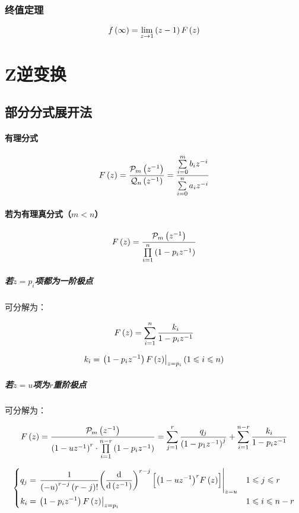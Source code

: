 \documentclass{article}
\begin{document}
\subsubsection{终值定理}

\[f\left(\infty\right)=\lim_{z\to1}\left(z-1\right)F\left(z\right)\]

\section{Z逆变换}

\subsection{部分分式展开法\label{Z变换部分分式展开法}}

\paragraph{有理分式}

\[F\left(z\right)=\frac{\mathcal P_m\left(z^{-1}\right)}{\mathcal Q_n\left(z^{-1}\right)}
    =\frac{\sum\limits_{i=0}^mb_iz^{-i}}{\sum\limits_{i=0}^na_iz^{-i}}\]

\paragraph{若为有理真分式（$m<n$）}

\[F\left(z\right)=\frac{\mathcal P_m\left(z^{-1}\right)}{\prod\limits_{i=1}^n\left(1-p_iz^{-1}\right)}\]

\subparagraph{若$z=p_i$项都为一阶极点}

可分解为：

\[F\left(z\right)=\sum_{i=1}^n\frac{k_i}{1-p_iz^{-1}}\]

\[k_i=\left.\left(1-p_iz^{-1}\right)F\left(z\right)\right|_{z=p_i}\left(1\leqslant i\leqslant n\right)\]

\subparagraph{若$z=u$项为$r$重阶极点}

可分解为：

\[F\left(z\right)=\frac{\mathcal P_m\left(z^{-1}\right)}{{\left(1-uz^{-1}\right)}^r\cdot\prod\limits_{i=1}^{n-r}\left(1-p_iz^{-1}\right)}
    =\sum_{j=1}^r\frac{q_j}{{\left(1-p_1z^{-1}\right)}^j}+\sum_{i=1}^{n-r}\frac{k_i}{1-p_iz^{-1}}\]

\[\left\{\begin{aligned}
        q_j & =\left.\frac1{{\left(-u\right)^{r-j}}\left(r-j\right)!}{\left(\frac{\mathrm d}{\mathrm d\left(z^{-1}\right)}\right)}^{r-j}\left[{\left(1-uz^{-1}\right)}^rF\left(z\right)\right]\right|_{z=u} &  & 1\leqslant j\leqslant r   \\
        k_i & =\left.\left(1-p_iz^{-1}\right)F\left(z\right)\right|_{z=p_i}                                                                                         &  & 1\leqslant i\leqslant n-r
    \end{aligned}\right.\]
\end{document}
